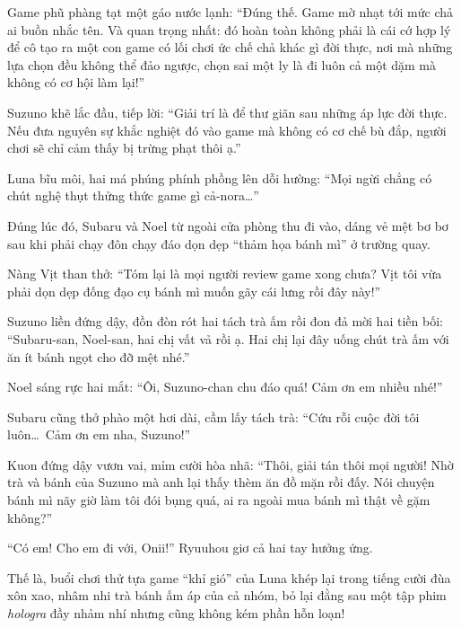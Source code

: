 \documentclass[../main.tex]{subfiles}
\begin{document}
Game phũ phàng tạt một gáo nước lạnh: ``Đúng thế. Game mờ nhạt tới mức chả ai buồn nhắc tên. Và quan trọng nhất: đó hoàn toàn không phải là cái cớ hợp lý để cô tạo ra một con game có lối chơi ức chế chả khác gì đời thực, nơi mà những lựa chọn đều không thể đảo ngược, chọn sai một ly là đi luôn cả một dặm mà không có cơ hội làm lại!''

Suzuno khẽ lắc đầu, tiếp lời: ``Giải trí là để thư giãn sau những áp lực đời thực. Nếu đưa nguyên sự khắc nghiệt đó vào game mà không có cơ chế bù đắp, người chơi sẽ chỉ cảm thấy bị trừng phạt thôi ạ.''

Luna bĩu môi, hai má phúng phính phồng lên dỗi hường: ``Mọi ngừi chẳng có chút nghệ thụt thửng thức game gì cả-nora\dots''

Đúng lúc đó, Subaru và Noel từ ngoài cửa phòng thu đi vào, dáng vẻ mệt bơ bơ sau khi phải chạy đôn chạy đáo dọn dẹp ``thảm họa bánh mì'' ở trường quay.

Nàng Vịt than thở: ``Tóm lại là mọi người review game xong chưa? Vịt tôi vừa phải dọn dẹp đống đạo cụ bánh mì muốn gãy cái lưng rồi đây này!''

Suzuno liền đứng dậy, đồn đòn rót hai tách trà ấm rồi đon đả mời hai tiền bối: ``Subaru-san, Noel-san, hai chị vất vả rồi ạ. Hai chị lại đây uống chút trà ấm với ăn ít bánh ngọt cho đỡ mệt nhé.''

Noel sáng rực hai mắt: ``Ôi, Suzuno-chan chu đáo quá! Cảm ơn em nhiều nhé!''

Subaru cũng thở phào một hơi dài, cầm lấy tách trà: ``Cứu rỗi cuộc đời tôi luôn\dots\ Cảm ơn em nha, Suzuno!''

Kuon đứng dậy vươn vai, mỉm cười hòa nhã: ``Thôi, giải tán thôi mọi người! Nhờ trà và bánh của Suzuno mà anh lại thấy thèm ăn đồ mặn rồi đấy. Nói chuyện bánh mì nãy giờ làm tôi đói bụng quá, ai ra ngoài mua bánh mì thật về gặm không?''

``Có em! Cho em đi với, Onii!'' Ryuuhou giơ cả hai tay hưởng ứng.

Thế là, buổi chơi thử tựa game ``khỉ gió'' của Luna khép lại trong tiếng cười đùa xôn xao, nhâm nhi trà bánh ấm áp của cả nhóm, bỏ lại đằng sau một tập phim \textit{hologra} đầy nhảm nhí nhưng cũng không kém phần hỗn loạn!
\end{document}
